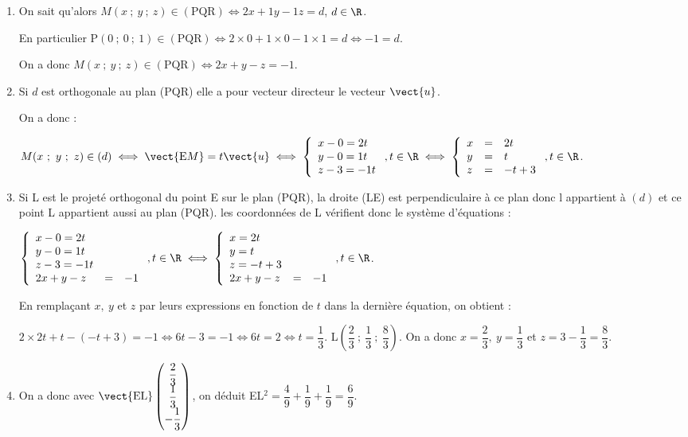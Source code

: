 \begin{enumerate}
\begin{enumerate}
$\bullet~~$$\vect{\text{QR}} \cdot \vect{u} = 2 - 2 + 0  = 0$.

Donc le vecteur $\vect{u}(2~;~1~;~- 1)$ orthogonal à deux vecteurs non colinéaires du plan (PQR) est normal à ce plan.
		\item 
On sait qu'alors $M(x~;~y~;~z) \in (\text{PQR}) \iff 2x + 1y - 1z = d$, \: $d \in \R$.

En particulier $\text{P}(0~;~0~;~1) \in (\text{PQR}) \iff 2\times 0  + 1\times 0 - 1 \times 1 = d \iff - 1 = d$.

On a donc $M(x~;~y~;~z) \in (\text{PQR}) \iff 2x + y - z = - 1$.
		\item 
Si $d$ est orthogonale au plan (PQR) elle a pour vecteur directeur le vecteur $\vect{u}$.

On a donc :

$M(x~;~y~;~z) \in (d) \iff \vect{\text{E}M} = t\vect{u}\iff \left\{\begin{array}{l c l}
x - 0 = 2t\\
y - 0= 1t\\
z - 3 = -1t
\end{array}\right., t \in \R \iff \left\{\begin{array}{l c l}
x&=& 2t\\
y&=& t\\
z &=& -t + 3
\end{array}\right., t \in \R$.
		\item 
Si L est le projeté orthogonal du point E sur le plan (PQR), la droite (LE) est perpendiculaire à ce plan donc l appartient à $(d)$ et ce point L appartient aussi au plan (PQR). les coordonnées de L vérifient donc le système d'équations :

$\left\{\begin{array}{l c l}
x - 0 = 2t\\
y - 0= 1t\\
z - 3 = -1t\\
2x + y - z &=& - 1
\end{array}\right., t \in \R \iff \left\{\begin{array}{l c l}
x= 2t\\
y= t\\
z= -t + 3\\
2x + y - z &=& - 1
\end{array}\right., t \in \R$.

En remplaçant $x,\:y$ et $z$ par leurs expressions en fonction de $t$ dans la dernière équation, on obtient :

$2\times 2t + t - (- t + 3) = - 1 \iff 6t - 3= - 1\iff 6t = 2 \iff t = \dfrac13$. L$\left(\dfrac23~;~\dfrac13~;~\dfrac83\right)$.
On a donc $x = \dfrac23, \: y = \dfrac13$ et $z = 3 - \dfrac13 = \dfrac83$.
		\item 
		On a donc avec $\vect{\text{EL}}\begin{pmatrix}\dfrac23\\\dfrac13\\- \dfrac13\end{pmatrix}$, on déduit EL$^2 = \dfrac49 + \dfrac19 + \dfrac19 = \dfrac69$.
		

\end{enumerate}
\end{enumerate}
